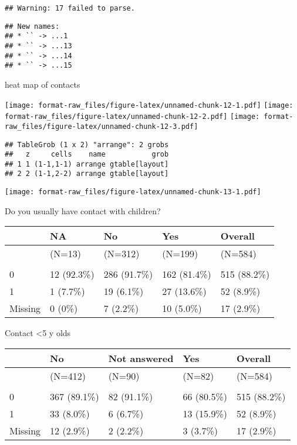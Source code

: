 \documentclass[
]{article}
\begin{document}
\begin{verbatim}
## Warning: 17 failed to parse.
\end{verbatim}

\begin{verbatim}
## New names:
## * `` -> ...1
## * `` -> ...13
## * `` -> ...14
## * `` -> ...15
\end{verbatim}

heat map of contacts

\texttt{[image: format-raw\_files/figure-latex/unnamed-chunk-12-1.pdf]}
\texttt{[image: format-raw\_files/figure-latex/unnamed-chunk-12-2.pdf]}
\texttt{[image: format-raw\_files/figure-latex/unnamed-chunk-12-3.pdf]}

\begin{verbatim}
## TableGrob (1 x 2) "arrange": 2 grobs
##   z     cells    name           grob
## 1 1 (1-1,1-1) arrange gtable[layout]
## 2 2 (1-1,2-2) arrange gtable[layout]
\end{verbatim}

\texttt{[image: format-raw\_files/figure-latex/unnamed-chunk-13-1.pdf]}

Do you usually have contact with children?

\begin{tabular}[t]{lllll}
\toprule
  & NA & No & Yes & Overall\\
\midrule
 & (N=13) & (N=312) & (N=199) & (N=584)\\
\addlinespace[0.3em]
\multicolumn{5}{l}{\textbf{piab\_pos}}\\
\hspace{1em}0 & 12 (92.3\%) & 286 (91.7\%) & 162 (81.4\%) & 515 (88.2\%)\\
\hspace{1em}1 & 1 (7.7\%) & 19 (6.1\%) & 27 (13.6\%) & 52 (8.9\%)\\
\hspace{1em}Missing & 0 (0\%) & 7 (2.2\%) & 10 (5.0\%) & 17 (2.9\%)\\
\bottomrule
\end{tabular}

Contact \textless5 y olds

\begin{tabular}[t]{lllll}
\toprule
  & No & Not answered & Yes & Overall\\
\midrule
 & (N=412) & (N=90) & (N=82) & (N=584)\\
\addlinespace[0.3em]
\multicolumn{5}{l}{\textbf{piab\_pos}}\\
\hspace{1em}0 & 367 (89.1\%) & 82 (91.1\%) & 66 (80.5\%) & 515 (88.2\%)\\
\hspace{1em}1 & 33 (8.0\%) & 6 (6.7\%) & 13 (15.9\%) & 52 (8.9\%)\\
\hspace{1em}Missing & 12 (2.9\%) & 2 (2.2\%) & 3 (3.7\%) & 17 (2.9\%)\\
\bottomrule
\end{tabular}
\end{document}
